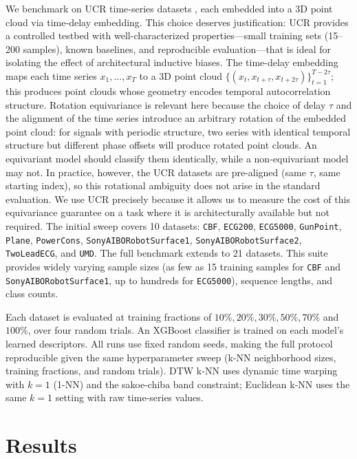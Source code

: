 \documentclass[a4paper,11pt]{article}
\begin{document}
We benchmark on UCR time-series datasets \cite{ucr2019}, each embedded into a 3D point cloud via time-delay embedding.
This choice deserves justification: UCR provides a controlled testbed with well-characterized properties---small training sets (15--200 samples), known baselines, and reproducible evaluation---that is ideal for isolating the effect of architectural inductive biases.
The time-delay embedding maps each time series $x_1,\dots,x_T$ to a 3D point cloud $\{(x_t,x_{t+\tau},x_{t+2\tau})\}_{t=1}^{T-2\tau}$; this produces point clouds whose geometry encodes temporal autocorrelation structure.
Rotation equivariance is relevant here because the choice of delay $\tau$ and the alignment of the time series introduce an arbitrary rotation of the embedded point cloud: for signals with periodic structure, two series with identical temporal structure but different phase offsets will produce rotated point clouds.
An equivariant model should classify them identically, while a non-equivariant model may not.
In practice, however, the UCR datasets are pre-aligned (same $\tau$, same starting index), so this rotational ambiguity does not arise in the standard evaluation.
We use UCR precisely because it allows us to measure the cost of this equivariance guarantee on a task where it is architecturally available but not required.
The initial sweep covers 10 datasets: \texttt{CBF}, \texttt{ECG200}, \texttt{ECG5000}, \texttt{GunPoint}, \texttt{Plane}, \texttt{PowerCons}, \texttt{SonyAIBORobotSurface1}, \texttt{SonyAIBORobotSurface2}, \texttt{TwoLeadECG}, and \texttt{UMD}.
The full benchmark extends to 21 datasets.
This suite provides widely varying sample sizes (as few as 15 training samples for \texttt{CBF} and \texttt{SonyAIBORobotSurface1}, up to hundreds for \texttt{ECG5000}), sequence lengths, and class counts.

Each dataset is evaluated at training fractions of $10\%, 20\%, 30\%, 50\%, 70\%$ and $100\%$, over four random trials.
An XGBoost classifier is trained on each model's learned descriptors.
All runs use fixed random seeds, making the full protocol reproducible given the same hyperparameter sweep (k-NN neighborhood sizes, training fractions, and random trials).
DTW k-NN uses dynamic time warping with $k=1$ (1-NN) and the sakoe-chiba band constraint; Euclidean k-NN uses the same $k=1$ setting with raw time-series values.

\section{Results} \label{sec:results}
\end{document}
